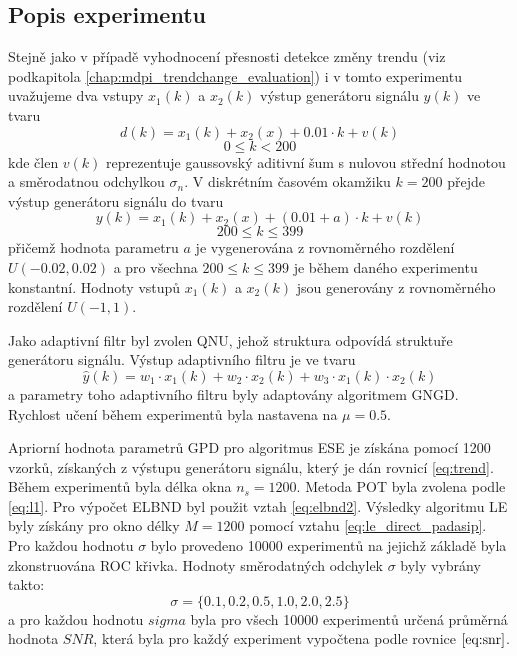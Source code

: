 \subsection{Popis experimentu}
Stejně jako v případě vyhodnocení přesnosti detekce změny trendu (viz podkapitola \ref{chap:mdpi_trendchange_evaluation}) i v tomto experimentu uvažujeme dva vstupy $x_1(k)$ a $x_2(k)$ výstup generátoru signálu $y(k)$ ve tvaru 
\begin{equation}
    \label{eq:trend}
    d(k)=x_1(k)+x_2(x)+0.01\cdot k + v(k)
\end{equation}
\begin{equation*}
0\leq k < 200
\end{equation*}
kde člen $v(k)$ reprezentuje gaussovský aditivní šum s nulovou střední hodnotou a směrodatnou odchylkou $\sigma_n$. V diskrétním časovém okamžiku $k=200$ přejde výstup generátoru signálu do tvaru
\begin{equation}
y(k)=x_1(k)+x_2(x)+(0.01 + a)\cdot k + v(k)
\end{equation}
\begin{equation*}
200 \leq k \leq 399
\end{equation*}
přičemž hodnota parametru $a$ je vygenerována z rovnoměrného rozdělení $U(-0.02,0.02)$ a pro všechna $200 \leq k \leq 399$ je během daného experimentu konstantní. Hodnoty vstupů $x_1(k)$ a $x_2(k)$ jsou generovány z rovnoměrného rozdělení $U(-1,1)$. 
\par 
Jako adaptivní filtr byl zvolen QNU, jehož struktura odpovídá struktuře generátoru signálu. Výstup adaptivního filtru je ve tvaru
\begin{equation}
\hat{y}(k)=w_1\cdot x_1(k)+w_2\cdot x_2(k) + w_3 \cdot x_1(k) \cdot x_2(k)
\end{equation}
a parametry toho adaptivního filtru byly adaptovány algoritmem GNGD. Rychlost učení během experimentů byla nastavena na $\mu=0.5$.
\par 
Apriorní hodnota parametrů GPD pro algoritmus ESE je získána pomocí 1200 vzorků, získaných z výstupu generátoru signálu, který je dán rovnicí \ref{eq:trend}. Během experimentů byla délka okna $n_s=1200$. Metoda POT byla zvolena podle \ref{eq:l1}. Pro výpočet ELBND byl použit vztah \ref{eq:elbnd2}. Výsledky algoritmu LE byly získány pro okno délky $M=1200$ pomocí vztahu \ref{eq:le_direct_padasip}. Pro každou hodnotu $\sigma$ bylo provedeno 10000 experimentů na jejichž základě byla zkonstruována ROC křivka. Hodnoty směrodatných odchylek $\sigma$ byly vybrány takto:
\begin{equation}
\sigma=\{0.1,0.2,0.5,1.0,2.0,2.5 \}
\end{equation}
a pro každou hodnotu $sigma$ byla pro všech 10000 experimentů určená průměrná hodnota $SNR$, která byla pro každý experiment vypočtena podle rovnice $\ref{eq:snr}$. 

